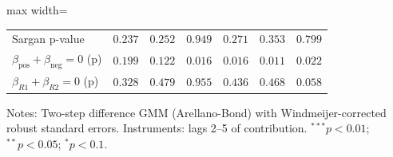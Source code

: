 \begin{adjustbox}{max width=\textwidth}
\begin{tabular}{l c c c c c c}
Sargan p-value                                    & $0.237$         & $0.252$         & $0.949$         & $0.271$        & $0.353$        & $0.799$        \\
$\beta_{\text{pos}} + \beta_{\text{neg}} = 0$ (p) & $0.199$         & $0.122$         & $0.016$         & $0.016$        & $0.011$        & $0.022$        \\
$\beta_{R1} + \beta_{R2} = 0$ (p)                 & $0.328$         & $0.479$         & $0.955$         & $0.436$        & $0.468$        & $0.058$        \\
\bottomrule
\end{tabular}
\end{adjustbox}
\begin{minipage}{\textwidth}\scriptsize Notes: Two-step difference GMM (Arellano-Bond) with Windmeijer-corrected robust standard errors. Instruments: lags 2--5 of contribution. $^{***}p<0.01$; $^{**}p<0.05$; $^{*}p<0.1$.\end{minipage}
